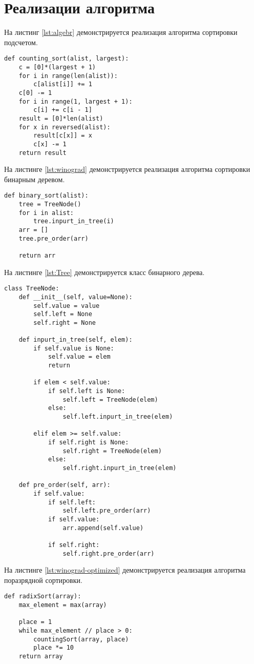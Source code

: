 \section{Реализации алгоритма}
На листинг \ref{lst:algebr} демонстрируется реализация алгоритма сортировки подсчетом. 


\captionsetup{singlelinecheck = false, justification=raggedright}
\begin{lstlisting}[label=lst:algebr,caption=Алгоритм сортировки подсчетомя]
def counting_sort(alist, largest):
	c = [0]*(largest + 1)
	for i in range(len(alist)):
		c[alist[i]] += 1
	c[0] -= 1
	for i in range(1, largest + 1):
		c[i] += c[i - 1]
	result = [0]*len(alist)
	for x in reversed(alist):
		result[c[x]] = x
		c[x] -= 1
	return result
\end{lstlisting}


На листинге \ref{lst:winograd} демонстрируется реализация алгоритма сортировки бинарным деревом.

\begin{lstlisting}[label=lst:winograd,caption=Алгоритм сортировки бинарным дерево]
def binary_sort(alist):
	tree = TreeNode()
	for i in alist:
		tree.inpurt_in_tree(i)
	arr = []
	tree.pre_order(arr)
	
	return arr
\end{lstlisting}	

На листинге \ref{lst:Tree} демонстрируется класс бинарного дерева.

\begin{lstlisting}[label=lst:Tree,caption=Класс бинарного дерев]
	class TreeNode:
	def __init__(self, value=None):
		self.value = value
		self.left = None
		self.right = None
	
	def inpurt_in_tree(self, elem):
		if self.value is None:
			self.value = elem
			return
		
		if elem < self.value:
			if self.left is None:
				self.left = TreeNode(elem)
			else:
				self.left.inpurt_in_tree(elem)
			
		elif elem >= self.value:
			if self.right is None:
				self.right = TreeNode(elem)
			else:
				self.right.inpurt_in_tree(elem)
	
	def pre_order(self, arr):
		if self.value:
			if self.left:
				self.left.pre_order(arr)
			if self.value: 
				arr.append(self.value)
			
			if self.right:
				self.right.pre_order(arr)
\end{lstlisting}	

\newpage
На листинге \ref{lst:winograd-optimized} демонстрируется реализация алгоритма поразрядной сортировки.
\begin{lstlisting}[label=lst:winograd-optimized,caption=Алгоритм поразрядной сортировки]
	def radixSort(array):
    max_element = max(array)

    place = 1
    while max_element // place > 0:
        countingSort(array, place)
        place *= 10
    return array
    
\end{lstlisting}	


